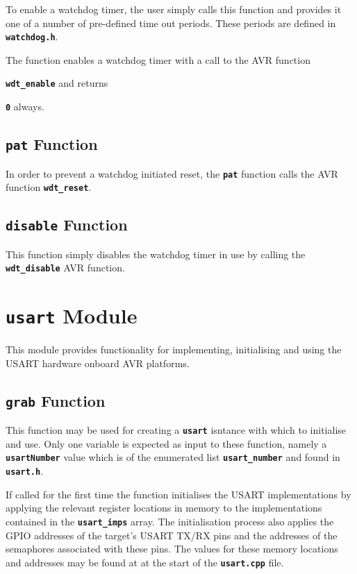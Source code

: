 \documentclass[a4paper, oneside, 11pt, titlepage, onecolumn, openright]{report}
\begin{document}
			To enable a watchdog timer, the user simply calls this function and provides it one of a number of pre-defined time out periods. These periods are defined in \textbf{\texttt{watchdog.h}}.
			
			The function enables a watchdog timer with a call to the AVR function {\textbf{\texttt{wdt\_enable}} and returns {\textbf{\texttt{0}} always.
			
\subsection{\textbf{\texttt{pat}} Function}
			\label{ss:HALwatchdogpatFunction}
			
			In order to prevent a watchdog initiated reset, the {\textbf{\texttt{pat}}} function calls the AVR function {\textbf{\texttt{wdt\_reset}}}.
			
\subsection{\textbf{\texttt{disable}} Function}
			\label{ss:HALwatchdogdisableFunction}
			
			This function simply disables the watchdog timer in use by calling the \textbf{\texttt{wdt\_disable}} AVR function.
			
\section{\textbf{\texttt{usart}} Module}
			\label{s:HALusartModule}
			
			This module provides functionality for implementing, initialising and using the USART hardware onboard AVR platforms.
			
\subsection{\textbf{\texttt{grab}} Function}
			\label{ss:HALusartgrabFunction}
			
			This function may be used for creating a \textbf{\texttt{usart}} isntance with which to initialise and use. Only one variable is expected as input to these function, namely a \textbf{\texttt{usartNumber}} value which is of the enumerated list \textbf{\texttt{usart\_number}} and found in \textbf{\texttt{usart.h}}.
			
			If called for the first time the function initialises the USART implementations by applying the relevant register locations in memory to the implementations contained in the \textbf{\texttt{usart\_imps}} array. The initialisation process also applies the GPIO addresses of the target's USART TX/RX pins and the addresses of the semaphores associated with these pins. The values for these memory locations and addresses may be found at at the start of the \textbf{\texttt{usart.cpp}} file.
			
}}
\end{document}
